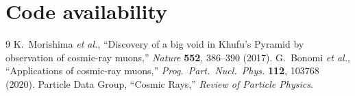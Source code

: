 \documentclass[11pt,a4paper]{article}
\begin{document}
\section*{Code availability}

\begin{thebibliography}{9}
 K.~Morishima \textit{et al.},
  ``Discovery of a big void in Khufu's Pyramid by observation of cosmic-ray
  muons,'' \textit{Nature} \textbf{552}, 386--390 (2017).
 G.~Bonomi \textit{et al.},
  ``Applications of cosmic-ray muons,''
  \textit{Prog.\ Part.\ Nucl.\ Phys.} \textbf{112}, 103768 (2020).
 Particle Data Group, ``Cosmic Rays,''
  \textit{Review of Particle Physics}.
\end{thebibliography}
\end{document}
